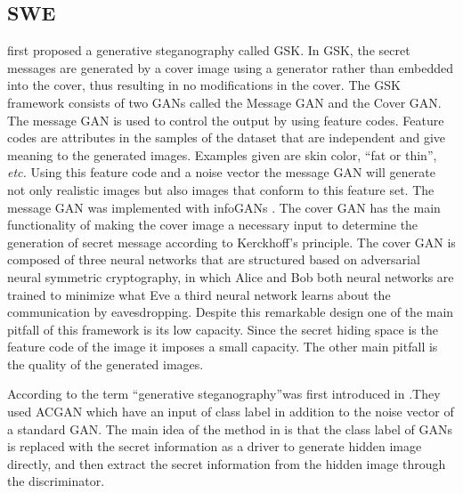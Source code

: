 \documentclass[../main/main.tex]{subfiles}
\begin{document}
	 \subsection{\gls{SWE}}
	   first proposed a generative steganography called \gls{GSK}. In \gls{GSK}, the secret messages are generated by a cover image using a generator rather than embedded into the cover, thus resulting in no modifications in the cover. The \gls{GSK} framework consists of two \gls{GAN}s called the Message \gls{GAN} and the Cover \gls{GAN}. The message \gls{GAN} is used to control the output by using feature codes. Feature codes are attributes in the samples of the dataset that are independent and give meaning to the generated images. Examples given are skin color, \textquotedblleft fat or thin\textquotedblright, \textit{etc.} Using this feature code and a noise vector the message \gls{GAN} will generate not only realistic images but also images that conform to this feature set. The message \gls{GAN} was implemented with \gls{infoGAN}s . The cover \gls{GAN} has the main functionality of making the cover image a necessary input to determine the generation of secret message according to Kerckhoff's principle. The cover \gls{GAN} is composed of three neural networks that are structured based on adversarial neural symmetric cryptography, in which Alice and Bob both neural networks are trained to minimize what Eve a third neural network learns about the communication by eavesdropping. Despite this remarkable design one of the main pitfall of this framework is its low capacity. Since the secret hiding space is the feature code of the image it imposes a small capacity. The other main pitfall is the quality of the generated images.  
	  
	 According to  the term \textquotedblleft generative steganography\textquotedblright  was first introduced in .They used \gls{ACGAN} which have an input of class label in addition to the noise vector of a standard \gls{GAN}.  The main idea of the method in  is that the class label of \gls{GAN}s is replaced with the secret information as a driver to generate hidden image directly, and then extract the secret information from the hidden image through the discriminator. %
	 
\end{document}
